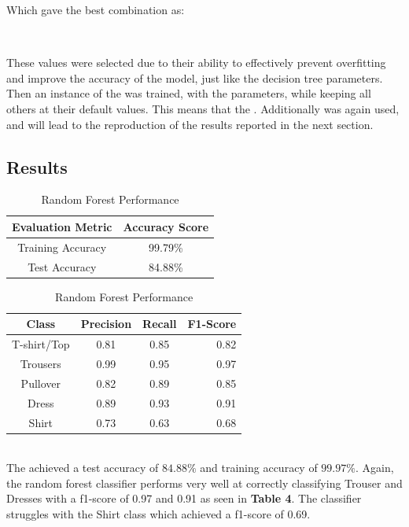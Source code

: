 Which gave the best combination as:\\

\begin{tcolorbox}[colback=white,
                  arc=0pt,
                outer=0pt]
\centering {} \, \,  \, \,  \, \, \\
   \end{tcolorbox}


These values were selected due to their ability to effectively prevent overfitting and improve the accuracy of the model, just like the decision tree parameters.
Then an instance of the  was trained, with the parameters, while keeping all others at their default values. This means that the .
Additionally  was again used, and will lead to the reproduction of the results reported in the next section.

\subsection{Results}\label{subsec:results}
\begin{table}[!ht]
\begin{subtable}[c]{0.4\textwidth}
\footnotesize
\centering
\begin{tabular}{ c | c }
 \toprule
 Evaluation Metric & Accuracy Score  \\
 \midrule
 Training Accuracy &  99.79\% \\
 Test Accuracy & 84.88\% \\
 \bottomrule
\end{tabular}
\captionsetup{justification=centering,margin=1cm}
\end{subtable}
\begin{subtable}[c]{0.6\textwidth}
\footnotesize
\centering
\begin{tabular}{c | c c r}
Class & Precision & Recall & F1-Score\\
\midrule
T-shirt/Top   &    0.81  &    0.85  &    0.82 \\
Trousers   &    0.99  &    0.95  &    0.97 \\
Pullover   &    0.82  &    0.89  &    0.85\\
Dress   &    0.89  &    0.93  &    0.91\\
Shirt   &    0.73  &    0.63  &    0.68\\
\end{tabular}
\captionsetup{justification=centering,margin=1cm}
\end{subtable}
\caption{Random Forest Performance}
\label{tab:random_forest_evaluation}
\end{table}\\

The  achieved a test accuracy of $84.88\%$ and training accuracy of $99.97\%$.
Again, the random forest classifier performs very well at correctly classifying Trouser and Dresses with a f1-score of 0.97 and 0.91 as seen in \textbf{Table 4}.
The classifier struggles with the Shirt class which achieved a f1-score of 0.69.
